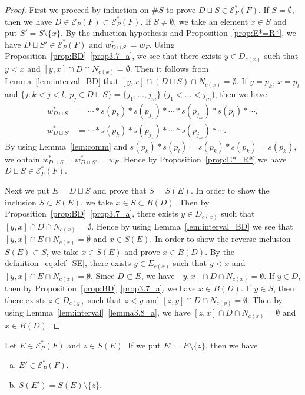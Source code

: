 \documentclass[ALCO,ThmDefs,Unicode,epreuves]{cedram}
\newcommand\EE{\mathcal{E}}
\begin{document}
\begin{proof}
First we proceed by induction on $\# S$ to prove $D \sqcup S \in \EE^*_P(F)$.
If $S = \emptyset$, then we have $D \in \EE_P(F) \subset \EE^*_P(F)$.
If $S \neq \emptyset$, we take an element $x \in S$ and put $S' = S \setminus \{ x \}$.
By the induction hypothesis and Proposition~\ref{prop:E*=R*}, 
we have $D \sqcup S' \in \EE^*_P(F)$ and $w^*_{D \sqcup S'} = w_F$.
Using Proposition~\ref{prop:BD}~\ref{prop3.7_a}, we see that there exists $y \in D_{c(x)}$ 
such that $y<x$ and $[y,x] \cap D \cap N_{c(x)} = \emptyset$.
Then it follows from Lemma~\ref{lem:interval_BD} that $[y,x] \cap (D \sqcup S) \cap N_{c(x)} = \emptyset$.
If $y = p_k$, $x = p_l$ and $\{ j : k < j < l, \ p_j \in D \sqcup S \} = \{ j_1, \dots, j_m \}$ 
($j_1 < \dots < j_m$), then we have 
\begin{align*}
w^*_{D \sqcup S} &= \cdots * s(p_k) * s(p_{j_1}) * \cdots * s(p_{j_m}) * s(p_l) * \cdots,
\\
w^*_{D \sqcup S'} &= \cdots * s(p_k) * s(p_{j_1}) * \cdots * s(p_{j_m}) * \cdots.
\end{align*}
By using Lemma~\ref{lem:comm} and $s(p_k)*s(p_l) = s(p_k) * s(p_k) = s(p_k)$, 
we obtain $w^*_{D \sqcup S} = w^*_{D \sqcup S'} = w_F$.
Hence by Proposition~\ref{prop:E*=R*} we have $D \sqcup S \in \EE^*_P(F)$.

Next we put $E = D \sqcup S$ and prove that $S = S(E)$.
In order to show the inclusion $S \subset S(E)$, we take $x \in S \subset B(D)$.
Then by Proposition~\ref{prop:BD}~\ref{prop3.7_a}, there exists $y \in D_{c(x)}$ 
such that $[y,x] \cap D \cap N_{c(x)} = \emptyset$.
Hence by using Lemma~\ref{lem:interval_BD} we see that $[y,x] \cap E \cap N_{c(x)} = \emptyset$ 
and $x \in S(E)$.
In order to show the reverse inclusion $S(E) \subset S$, we take $x \in S(E)$ and prove $x \in B(D)$.
By the definition~\eqref{eq:def_SE}, there exists $y \in E_{c(x)}$ 
such that $y < x$ and $[y,x] \cap E \cap N_{c(x)} = \emptyset$.
Since $D \subset E$, we have $[y,x] \cap D \cap N_{c(x)} = \emptyset$.
If $y \in D$, then by Proposition~\ref{prop:BD}~\ref{prop3.7_a}, we have $x \in B(D)$.
If $y \in S$, then there exists $z \in D_{c(y)}$ such that $z<y$ and $[z,y] \cap D \cap N_{c(y)} = \emptyset$.
Then by using Lemma~\ref{lem:interval}~\ref{lemma3.8_a}, we have $[z,x] \cap D \cap N_{c(x)} = \emptyset$ and $x \in B(D)$.
\end{proof}

\eject
\begin{lemm}
\label{lem:SE3}
Let $E \in \EE^*_P(F)$ and $z \in S(E)$. If we put $E' = E \setminus \{ z \}$, then we have
\begin{enumerate}[(a)]
\item\label{lemma3.17_a} %
$E' \in \EE^*_P(F)$.
\item\label{lemma3.17_b} %
$S( E' ) = S(E) \setminus \{ z \}$.
\end{enumerate}
\end{lemm}
\end{document}
